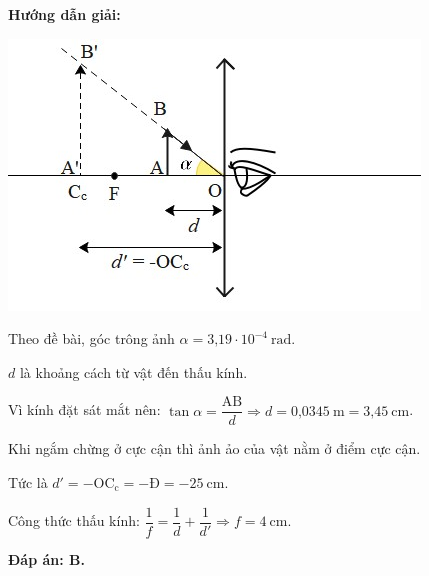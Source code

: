 {\begin{center}
	\textbf{Hướng dẫn giải:}
\end{center}

{ \begin{center}
		\includegraphics[scale=0.8]{../figs/VN11-PH-41-L-029-2-h50.jpg}
	\end{center}

Theo đề bài, góc trông ảnh $\alpha=\text{3,19}\cdot 10^{-4}\  \text{rad}$.
	
$d$ là khoảng cách từ vật đến thấu kính.

Vì kính đặt sát mắt nên: $\tan \alpha=\dfrac{\text{AB}}{d}\Rightarrow d=\text{0,0345}\ \text{m}=\text{3,45}\ \text{cm}$.

Khi ngắm chừng ở cực cận thì ảnh ảo của vật nằm ở điểm cực cận. 

Tức là $d'=-\text{OC}_{\text{c}}=-\text{Đ}=-25\ \text{cm}$.

Công thức thấu kính: $\dfrac{1}{f}=\dfrac{1}{d}+\dfrac{1}{d'}\Rightarrow f =4\ \text{cm}$.

\textbf{Đáp án: B.}
	
	
}

 
}